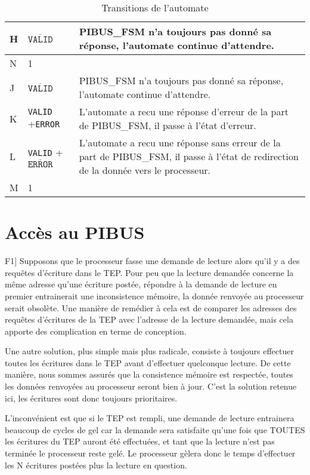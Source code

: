 \documentclass{article}
\begin{document}
\begin{table}[H]
\begin{tabular}{| l | l | p{12cm} |}
H
&
 $\overline{\texttt{VALID}}$
&
PIBUS\_FSM n'a toujours pas donné sa réponse, l'automate continue d'attendre.
\\
\hline

N
&
1
&
\\

\hline
\hline

J
&
 $\overline{\texttt{VALID}}$
&
PIBUS\_FSM n'a toujours pas donné sa réponse, l'automate continue d'attendre.
\\
\hline

K
&
\texttt{VALID}  +\texttt{ERROR}  
&
L'automate a recu une réponse d'erreur de la part de PIBUS\_FSM,
il passe à l'état d'erreur.
\\
\hline

L
&
\texttt{VALID}  + $\overline{\texttt{ERROR}}$
&
L'automate a recu une réponse sans erreur de la part de PIBUS\_FSM,
il passe à l'état de redirection de la donnée vers le processeur.
\\
\hline

M
&
1
&
\\
\hline

\end{tabular}
\caption{Transitions de l'automate}
\endgroup
\end{table}


\section{Accès au PIBUS}


F1]
Supposons que le processeur fasse une demande de lecture alors qu'il y a des
requêtes d'écriture dans le TEP. Pour peu que la lecture demandée concerne la
même adresse qu'une écriture postée, répondre à la demande de lecture en premier
entrainerait une inconsistence mémoire, la donnée renvoyée au processeur serait
obsolète. Une manière de remédier à cela est de comparer les adresses des
requêtes d'écritures de la TEP avec l'adresse de la lecture demandée, mais cela
apporte des complication en terme de conception.

Une autre solution, plus
simple mais plus radicale, consiste à toujours effectuer toutes les écritures
dans le TEP avant d'effectuer quelconque lecture. De cette manière, nous sommes
assurés que la consistence mémoire est respectée, toutes les données renvoyées
au processeur seront bien à jour. C'est la solution retenue ici, les écritures
sont donc toujours prioritaires.

L'inconvénient est que si le TEP est rempli, une demande de lecture entrainera
beaucoup de cycles de gel car la demande sera satisfaite qu'une fois que TOUTES
les écritures du TEP auront été effectuées, et tant que la lecture n'est pas
terminée le processeur reste gelé. Le processeur gèlera donc le temps
d'effectuer les N écritures postées plus la lecture en question.
\end{document}
